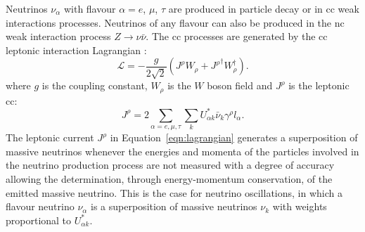 Neutrinos $\nu_\alpha$ with flavour $\alpha = e$, $\mu$, $\tau$ are produced in particle decay or in \acrshort{cc} weak interactions processes. Neutrinos of any flavour can also be produced in the \acrshort{nc} weak interaction process $Z \rightarrow \nu\bar{\nu}$. The \acrshort{cc} processes are generated by the \acrshort{cc} leptonic interaction Lagrangian \cite{halzen}:
\begin{equation}
\label{eqn:lagrangian}
\mathscr{L} = -\frac{g}{2\sqrt{2}}\left( J^\rho W_\rho + {J^\rho}^\dagger W_\rho^\dagger \right).
\end{equation}
where $g$ is the coupling constant, $W_\rho$ is the $W$ boson field and $J^\rho$ is the leptonic \acrshort{cc}:
\begin{equation}
J^\rho = 2 \sum_{\alpha=e,\mu,\tau} \sum_k U^*_{\alpha k} \bar{\nu}_k \gamma^\rho l_\alpha.
\end{equation}
The leptonic current $J^\rho$ in Equation~\eqref{eqn:lagrangian} generates a superposition of massive neutrinos whenever the energies and momenta of the particles involved in the neutrino production process are not measured with a degree of accuracy allowing the determination, through energy-momentum conservation, of the emitted massive neutrino. This is the case for neutrino oscillations, in which a flavour neutrino $\nu_\alpha$ is a superposition of massive neutrinos $\nu_k$ with weights proportional to $U^*_{\alpha k}$. 





